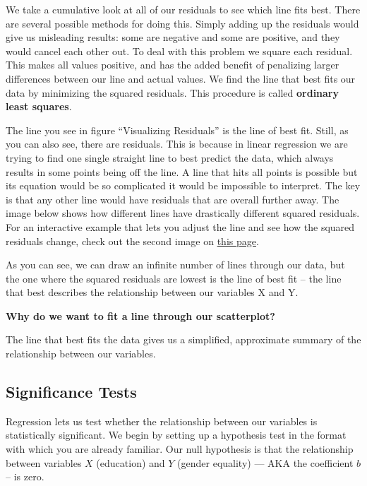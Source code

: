 \documentclass{book}
\newenvironment{shaded*}{
    \begin{center}
    \begin{tabular}{|p{0.9\textwidth}|}
    \hline\\
    }
    { 
    \\\\\hline
    \end{tabular} 
    \end{center}
}
\begin{document}
We take a cumulative look at all of our residuals to see which line fits best.
There are several possible methods for doing this. Simply adding up the
residuals would give us misleading results: some are negative and some are
positive, and they would cancel each other out. To deal with this problem we
square each residual. This makes all values positive, and has the added
benefit of penalizing larger differences between our line and actual values.
We find the line that best fits our data by minimizing the squared residuals.
This procedure is called \textbf{ordinary least squares}.

The line you see in figure ``Visualizing Residuals'' is the line of best fit.
Still, as you can also see, there are residuals. This is because in linear
regression we are trying to find one single straight line to best predict the
data, which always results in some points being off the line. A line that hits
all points is possible but its equation would be so complicated it would be
impossible to interpret. The key is that any other line would have residuals
that are overall further away. The image below shows how different lines have
drastically different squared residuals. For an interactive example that lets
you adjust the line and see how the squared residuals change, check out the
second image on
\href{http://setosa.io/ev/ordinary-least-squares-regression/}{this page}.

As you can see, we can draw an infinite number of lines through our data, but
the one where the squared residuals are lowest is the line of best fit -- the
line that best describes the relationship between our variables X and Y.

\textbf{Why do we want to fit a line through our scatterplot?}

\begin{shaded*}

The line that best fits the data gives us a simplified, approximate summary of
the relationship between our variables.

\end{shaded*}

\hypertarget{significance-tests}{%
\subsection{Significance Tests}\label{significance-tests}}

Regression lets us test whether the relationship between our variables is
statistically significant. We begin by setting up a hypothesis test in the
format with which you are already familiar. Our null hypothesis is that the
relationship between variables \(X\) (education) and \(Y\) (gender equality)
--- AKA the coefficient \(b\) -- is zero.
\end{document}
